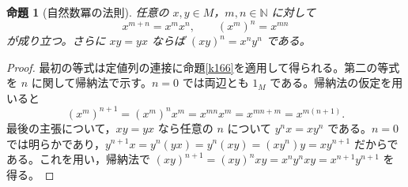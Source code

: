 \documentclass[a5paper,10pt,dvipdfmx]{jsarticle}
\theoremstyle{definition}
\theoremstyle{plain}
\newtheorem{prop}[ruledef]{命題}
\begin{document}
\begin{prop}[自然数冪の法則]\label{k169}
任意の $x,y\in M$，$m,n\in\mathbb N$ に対して
\[x^{m+n}=x^mx^n,\qquad (x^m)^n=x^{mn}\]
が成り立つ。さらに $xy=yx$ ならば $(xy)^n=x^ny^n$ である。
\end{prop}
\begin{proof}
最初の等式は定値列の連接に命題\ref{k166}を適用して得られる。第二の等式を $n$ に関して帰納法で示す。$n=0$ では両辺とも $1_M$ である。帰納法の仮定を用いると
\[(x^m)^{n+1}=(x^m)^nx^m=x^{mn}x^m=x^{mn+m}=x^{m(n+1)}.\]
最後の主張について，$xy=yx$ なら任意の $n$ について $y^nx=xy^n$ である。$n=0$ では明らかであり，$y^{n+1}x=y^n(yx)=y^n(xy)=(xy^n)y=xy^{n+1}$ だからである。これを用い，帰納法で $(xy)^{n+1}=(xy)^nxy=x^ny^nxy=x^{n+1}y^{n+1}$ を得る。
\end{proof}
\end{document}
